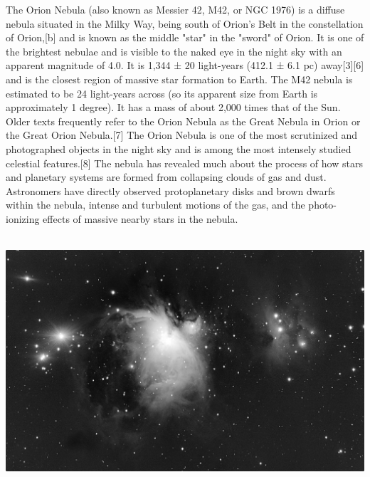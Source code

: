 {\footnotesize\color{white}
The Orion Nebula (also known as Messier 42, M42, or NGC 1976) is a diffuse nebula situated in the Milky Way, being south of Orion's Belt in the constellation of Orion,[b] and is known as the middle "star" in the "sword" of Orion. It is one of the brightest nebulae and is visible to the naked eye in the night sky with an apparent magnitude of 4.0. It is 1,344 ± 20 light-years (412.1 ± 6.1 pc) away[3][6] and is the closest region of massive star formation to Earth. The M42 nebula is estimated to be 24 light-years across (so its apparent size from Earth is approximately 1 degree). It has a mass of about 2,000 times that of the Sun. Older texts frequently refer to the Orion Nebula as the Great Nebula in Orion or the Great Orion Nebula.[7] The Orion Nebula is one of the most scrutinized and photographed objects in the night sky and is among the most intensely studied celestial features.[8] The nebula has revealed much about the process of how stars and planetary systems are formed from collapsing clouds of gas and dust. Astronomers have directly observed protoplanetary disks and brown dwarfs within the nebula, intense and turbulent motions of the gas, and the photo-ionizing effects of massive nearby stars in the nebula.


}\ \\
\includegraphics[width=\textwidth]{../Imaging//Grayscale/Great_Orion_Nebula.jpg}
